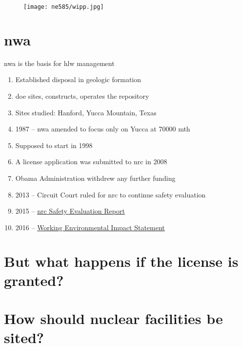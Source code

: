 \documentclass[aspectratio=1610,pdftex,dvipsnames,compress,xcolor={dvipsnames}]{beamer}
\newcommand{\acf}{\acrfull} %
\newcommand{\acl}{\acrlong} %
\newcommand{\acs}{\acrshort} %
\begin{document}
\begin{frame}{}
    \begin{figure}
        \centering
        \texttt{[image: ne585/wipp.jpg]}
    \end{figure}
\end{frame}


\section{\acf{nwa}}


\addtocounter{framenumber}{-1} 
\begin{frame}{\acl{nwa} is the basis for \acs{hlw} management}
    \begin{enumerate}[series=outerlist,topsep=0pt,itemsep=7pt,leftmargin=*,label=(\arabic*)]
        \item[]Established disposal in geologic formation
        \item[]\acs{doe} sites, constructs, operates the repository
        \item[]Sites studied: Hanford, Yucca Mountain, Texas
        \item[]1987 -- \acs{nwa} amended to focus only on Yucca at 70000 \acs{mth}
        \item[]Supposed to start in 1998
        \item[]A license application was submitted to \acs{nrc} in 2008
        \item[]Obama Administration withdrew any further funding
        \item[]2013 -- Circuit Court ruled for \acs{nrc} to continue safety evaluation
        \item[]2015 -- \href{https://www.nrc.gov/reading-rm/doc-collections/nuregs/staff/sr1949/index.html}{\acs{nrc} Safety Evaluation Report}
        \item[]2016 -- \href{https://www.nrc.gov/waste/hlw-disposal/key-documents.html}{Working Environmental Impact Statement}
    \end{enumerate}
\end{frame}

\section{But what happens if the license is granted?}
\section{How should nuclear facilities be sited?}
\end{document}
